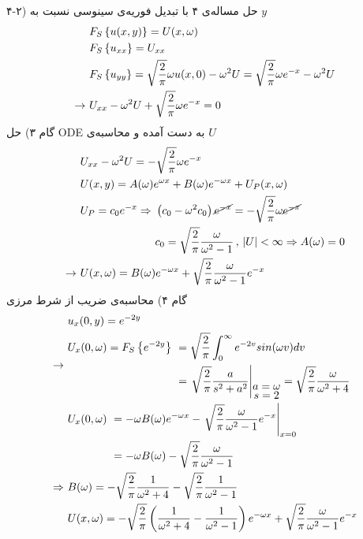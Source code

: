 ۴-۲) حل مساله‌ی ۴ با تبدیل فوریه‌ی سینوسی نسبت به
$y$
\begin{equation*}
	\begin{aligned}
		&\
		F_S\left\{u(x,y)\right\}=U(x,\omega)
		\\ &\
		F_S\left\{u_{xx}\right\}=U_{xx}
		\\ &\
		F_S\left\{u_{yy}\right\}=\sqrt\frac2\pi\omega u(x,0)-\omega^2U=\sqrt\frac2\pi\omega e^{-x}-\omega^2U
		\\ \rightarrow &\
		U_{xx}-\omega^2U+\sqrt\frac2\pi\omega e^{-x}=0
	\end{aligned}
\end{equation*}
گام ۳) حل ODE به دست آمده و محاسبه‌ی
$U$
\begin{equation*}
	\begin{aligned}
		&\
		U_{xx}-\omega^2U=-\sqrt\frac2\pi\omega e^{-x}
		\\ &\
		U(x,y)=A(\omega)e^{\omega x}+B(\omega)e^{-\omega x}+U_P(x,\omega)
		\\ &\
		\begin{aligned}
					U_P=c_0e^{-x}\Rightarrow &\
					\left(c_0-\omega^2 c_0\right)\cancel{e^{-x}}=-\sqrt\frac2\pi\omega\cancel{e^{-x}}
					\\ &\
					c_0=\sqrt\frac2\pi\frac\omega{\omega^2-1}\, , \, \left|U\right|<\infty \Rightarrow A(\omega)=0
		\end{aligned}
		\\ \rightarrow &\
		U(x,\omega)=B(\omega)e^{-\omega x}+\sqrt\frac2\pi\frac\omega{\omega^2-1}e^{-x}
	\end{aligned}
\end{equation*}
گام ۴) محاسبه‌ی ضریب از شرط مرزی
\begin{equation*}
	\begin{aligned}
		&\
		u_x(0,y)=e^{-2y}
		\\ \rightarrow &\
		\begin{aligned}
			U_x(0,\omega)=F_S\set{e^{-2y}}&\ =\sqrt\frac2\pi\int_0^\infty e^{-2v}sin(\omega v)dv
			\\ &\
			= \left.{\sqrt\frac2\pi\frac a{s^2+a^2}}\right|_{\myover{s=2}{a=\omega}}=\sqrt\frac2\pi\frac\omega{\omega^2+4}
		\end{aligned}
		\\ &\
		\begin{aligned}
			U_x(0,\omega) &\ =-\omega B(\omega) e^{-\omega x}-\left.{\sqrt\frac2\pi\frac\omega{\omega^2-1}e^{-x}}\right|_{x=0}
			\\ &\
			=-\omega B(\omega)-\sqrt\frac2\pi\frac\omega{\omega^2-1}
		\end{aligned}
		\\ \Rightarrow &\
		B(\omega)=-\sqrt\frac2\pi\frac1{\omega^2+4}-\sqrt\frac2\pi\frac1{\omega^2-1}
		\\ &\
		U(x,\omega)=-\sqrt\frac2\pi\pr{\frac1{\omega^2+4}-\frac1{\omega^2-1}}e^{-\omega x}+\sqrt\frac2\pi\frac\omega{\omega^2-1}e^{-x}
	\end{aligned}
\end{equation*}
